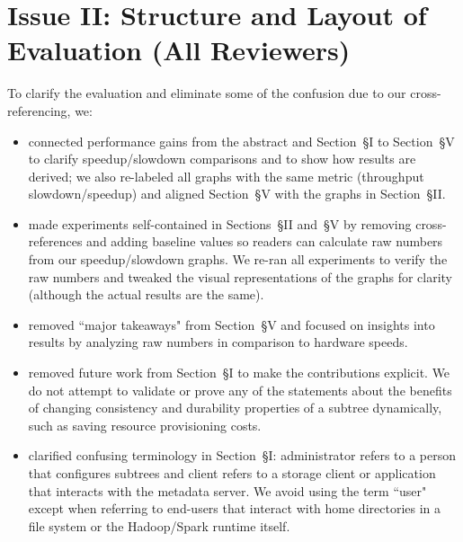 \documentclass[onecolumn,conference]{IEEEtran}
\begin{document}
\section*{Issue II: Structure and Layout of Evaluation (All Reviewers)}

To clarify the evaluation and eliminate some of the confusion due to our
cross-referencing, we:

\begin{itemize}

  \item connected performance gains from the abstract and Section~{\S}I to
Section~{\S}V to clarify speedup/slowdown comparisons and to show how results
are derived; we also re-labeled all graphs with the same metric (throughput
slowdown/speedup) and aligned Section~{\S}V with the graphs in Section~{\S}II.

  \item made experiments self-contained in Sections~{\S}II and~{\S}V by
removing cross-references and adding baseline values so readers can calculate
raw numbers from our speedup/slowdown graphs. We re-ran all experiments to
verify the raw numbers and tweaked the visual representations of the graphs for
clarity (although the actual results are the same).


  \item removed ``major takeaways" from Section~{\S}V and focused on
insights into results by analyzing raw numbers in comparison to hardware
speeds.

  \item removed future work from Section~{\S}I to make the contributions
explicit. We do not attempt to validate or prove any of the statements about
the benefits of changing consistency and durability properties of a subtree
dynamically, such as saving resource provisioning costs.  

  \item clarified confusing terminology in Section~{\S}I: administrator refers
to a person that configures subtrees and client refers to a storage client or
application that interacts with the metadata server. We avoid using the term
``user" except when referring to end-users that interact with home directories
in a file system or the Hadoop/Spark runtime itself.

\end{itemize}
\end{document}
